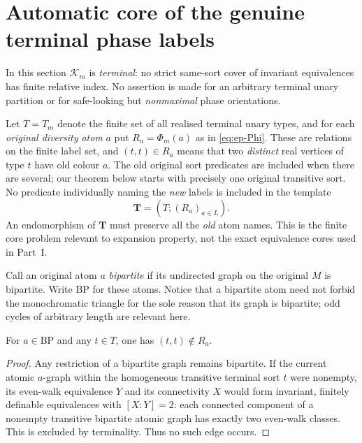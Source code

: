 \section{Automatic core of the genuine terminal phase labels}
\label{sec:ep-automatic-core}

In this section \(\mathcal K_m\) is \emph{terminal}:
no strict same-sort cover of invariant equivalences has
finite relative index. No assertion is made for an arbitrary
terminal unary partition or for safe-looking but
\emph{nonmaximal} phase orientations.

Let \(T=T_m\) denote the finite set of all realised terminal
unary types, and for each \emph{original diversity atom} \(a\)
put \(R_a=\Phi_m(a)\) as in
\eqref{eq:ep-Phi}. These are relations on the finite
label set, and \((t,t)\in R_a\) means that two
\emph{distinct} real vertices of type \(t\) have
old colour \(a\). The old original sort predicates are
included when there are several; our theorem below
starts with precisely one original transitive sort.
No predicate individually naming the \emph{new}
labels is included in the template
\[
   \mathbf T=(T;(R_a)_{a\in L}).
   \tag{C1}\label{eq:ep-template}
\]
An endomorphism of \(\mathbf T\) must preserve all the
\emph{old} atom names. This is the finite core problem
relevant to expansion property, not the exact
equivalence cores used in Part~I.

Call an original atom \(a\) \emph{bipartite} if its
undirected graph on the original \(M\) is bipartite.
Write \(\mathrm{BP}\) for these atoms. Notice that
a bipartite atom need not forbid the monochromatic
triangle for the sole reason that its graph is
bipartite; odd cycles of arbitrary length are
relevant here.

\begin{lemma}
\label{lem:ep-bp-loopless}
For \(a\in\mathrm{BP}\) and any \(t\in T\), one has
\((t,t)\notin R_a\).
\end{lemma}
\begin{proof}
Any restriction of a bipartite graph remains bipartite.
If the current atomic \(a\)-graph within the
homogeneous transitive terminal sort \(t\) were nonempty,
its even-walk equivalence \(Y\) and its connectivity
\(X\) would form invariant, finitely definable
equivalences with \([X:Y]=2\): each connected component
of a nonempty transitive bipartite atomic graph
has exactly two even-walk classes. This is excluded
by terminality. Thus no such edge occurs.
\end{proof}

